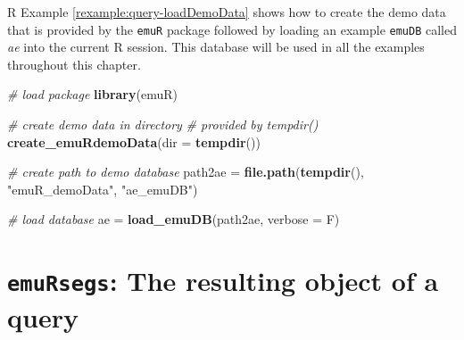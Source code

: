 \documentclass[]{book}
\newenvironment{Shaded}{\begin{snugshade}}{\end{snugshade}}
\newcommand{\CommentTok}[1]{\textcolor[rgb]{0.56,0.35,0.01}{\textit{#1}}}
\newcommand{\DataTypeTok}[1]{\textcolor[rgb]{0.13,0.29,0.53}{#1}}
\newcommand{\KeywordTok}[1]{\textcolor[rgb]{0.13,0.29,0.53}{\textbf{#1}}}
\newcommand{\NormalTok}[1]{#1}
\newcommand{\StringTok}[1]{\textcolor[rgb]{0.31,0.60,0.02}{#1}}
\theoremstyle{definition}
\theoremstyle{definition}
\theoremstyle{definition}
\theoremstyle{remark}
\begin{document}
R Example \ref{rexample:query-loadDemoData} shows how to create the demo
data that is provided by the \texttt{emuR} package followed by loading
an example \texttt{emuDB} called \emph{ae} into the current R session.
This database will be used in all the examples throughout this chapter.

\begin{Shaded}
\begin{Highlighting}[]
\CommentTok{# load package}
\KeywordTok{library}\NormalTok{(emuR)}

\CommentTok{# create demo data in directory}
\CommentTok{# provided by tempdir()}
\KeywordTok{create_emuRdemoData}\NormalTok{(}\DataTypeTok{dir =} \KeywordTok{tempdir}\NormalTok{())}

\CommentTok{# create path to demo database}
\NormalTok{path2ae =}\StringTok{ }\KeywordTok{file.path}\NormalTok{(}\KeywordTok{tempdir}\NormalTok{(), }\StringTok{"emuR_demoData"}\NormalTok{, }\StringTok{"ae_emuDB"}\NormalTok{)}

\CommentTok{# load database}
\NormalTok{ae =}\StringTok{ }\KeywordTok{load_emuDB}\NormalTok{(path2ae, }\DataTypeTok{verbose =}\NormalTok{ F)}
\end{Highlighting}
\end{Shaded}

\hypertarget{sec:query_emuRsegs}{%
\section{\texorpdfstring{\texttt{emuRsegs}: The resulting object of a
query}{emuRsegs: The resulting object of a query}}\label{sec:query_emuRsegs}}
\end{document}
